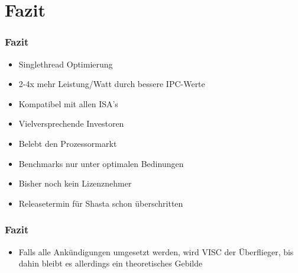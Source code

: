 \documentclass[xcolor=dvipsnames]{beamer}
\newcommand{\pro}{\item[\boldmath${\color{green}+}$ ]}
\newcommand{\con}{\item[\boldmath$ {\color{red}-}$ ]}
\begin{document}
\section{Fazit}
\begin{frame}
\frametitle{Fazit}
	\begin{itemize}
	  \pro Singlethread Optimierung
		\pro 2-4x mehr Leistung/Watt durch bessere IPC-Werte
		\pro Kompatibel mit allen ISA's
		\pro Vielversprechende Investoren
		\pro Belebt den Prozessormarkt
		\con Benchmarks nur unter optimalen Bedinungen
		\con Bisher noch kein Lizenznehmer
		\con Releasetermin für Shasta schon überschritten
	\end{itemize}
\end{frame}

\begin{frame}
\frametitle{Fazit}
	\begin{itemize}
	  \item Falls alle Ankündigungen umgesetzt werden, wird VISC der Überflieger, bis dahin bleibt es allerdings ein theoretisches Gebilde
	\end{itemize}
\end{frame}
\end{document}
